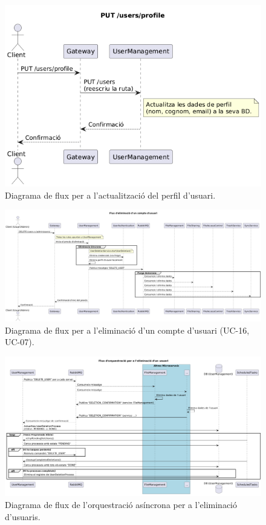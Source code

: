 \begin{figure}[H]
    \centering
    \includegraphics[width=1\textwidth]{Figures/flux/update_user_info.png}
    \caption{Diagrama de flux per a l'actualització del perfil d'usuari.}
    \label{fig:flow_update_user_info}
\end{figure}

\begin{figure}[H]
    \centering
    \includegraphics[width=1\textwidth]{Figures/flux/delete_user.png}
    \caption{Diagrama de flux per a l'eliminació d'un compte d'usuari (UC-16, UC-07).}
    \label{fig:flow_delete_user}
\end{figure}

\begin{figure}[H]
    \centering
    \includegraphics[width=1\textwidth]{Figures/flux/delete_user_async.png}
    \caption{Diagrama de flux de l'orquestració asíncrona per a l'eliminació d'usuaris.}
    \label{fig:flow_delete_user_async}
\end{figure}

